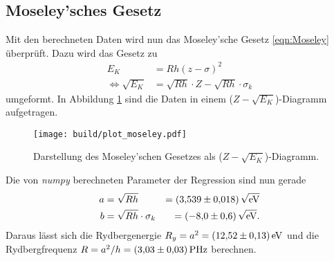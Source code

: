 

\subsection{Moseley'sches Gesetz}
\label{sec:Moseley}
Mit den berechneten Daten wird nun das Moseley'sche Gesetz \eqref{eqn:Moseley} überprüft. Dazu wird das Gesetz zu
\begin{align*}
    E_K &= R h (z - \sigma)^2 \\
    \Leftrightarrow\sqrt{E_K} &= \sqrt{R h}\cdot Z - \sqrt{R h}\cdot\sigma_k
\end{align*}
umgeformt. In Abbildung \ref{fig:moseley} sind die Daten in einem ($Z-\sqrt{E_K}$)-Diagramm aufgetragen.
\begin{figure}[H]
    \centering
    \texttt{[image: build/plot\_moseley.pdf]}
    \caption{Darstellung des Moseley'schen Gesetzes als ($Z-\sqrt{E_K}$)-Diagramm.}
    \label{fig:moseley}
\end{figure}
Die von \textit{numpy} \cite{numpy} berechneten Parameter der Regression sind nun gerade
\begin{align*}
    a&=\sqrt{R h}              &=\SI{3.539\pm 0.018}{\sqrt{\electronvolt}}\\
    b&=\sqrt{R h}\cdot\sigma_k &=\SI{-8.0 \pm 0.6}{\sqrt{\electronvolt}}.
\end{align*}
Daraus lässt sich die Rydbergenergie $R_y=a^2=\SI{12.52\pm 0.13}{\electronvolt}$ und die Rydbergfrequenz $R=a^2/h=\SI{3.03\pm 0.03}{\peta\hertz}$
berechnen.
